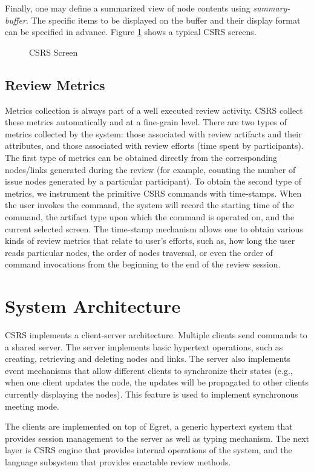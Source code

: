 Finally, one may define a summarized view of node contents
using {\it summary-buffer}. The specific items to be displayed on the
buffer and their display format can be specified in advance.
Figure \ref{fig:csrs-screen} shows a typical CSRS screens.

\begin{figure}[htb]
  {\centerline{}}
  \caption{CSRS Screen}
  \label{fig:csrs-screen}
\end{figure}

\subsection{Review Metrics}
Metrics collection is always part of a well executed review activity.
CSRS collect these metrics automatically and at a
fine-grain level. There are two types of metrics collected by
the system: those associated with review artifacts and their
attributes, and those associated with review efforts (time spent by
participants).  The first type of metrics can be obtained directly
from the corresponding nodes/links generated during the review
(for example, counting the number of issue nodes generated by a
particular participant). To obtain the second type of metrics, we
instrument the primitive CSRS commands with time-stamps. When the user
invokes the command, the system will record the starting time of the
command, the artifact type upon which the command is operated on, and the
current selected screen. 
The time-stamp mechanism allows one to obtain various kinds of
review metrics that relate to user's efforts, such as, how long the
user reads particular nodes, the order of nodes traversal,
or even the order of command invocations from the beginning to
the end of the review session.

\section{System Architecture}
CSRS implements a client-server architecture. Multiple clients send
commands to a shared server. 
The server implements basic hypertext operations,
such as creating, retrieving and deleting nodes and links.
The server also implements event mechanisms
that allow different clients to synchronize their states (e.g., when one
client updates the node, the updates will be propagated to other clients
currently displaying the nodes). This  feature is used to
implement synchronous meeting mode.

The clients are implemented on top of Egret, a generic hypertext system
that provides session management to the server as well as typing
mechanism. The next layer is CSRS engine that provides internal
operations of the system, and the language subsystem that provides
enactable review methods.

